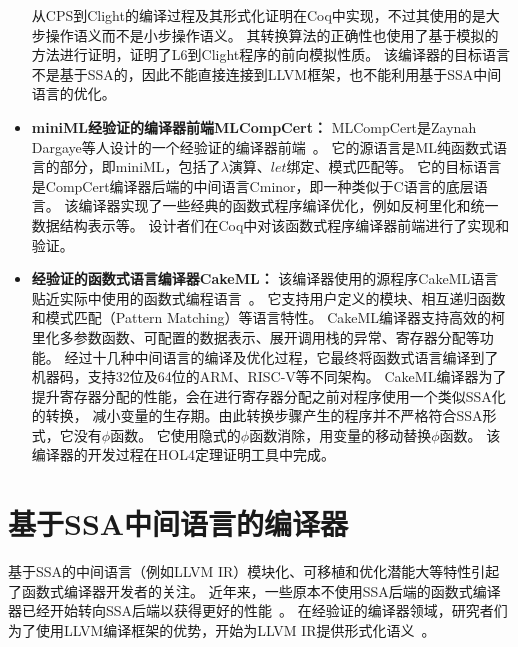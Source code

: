 \begin{itemize}
    从CPS到Clight的编译过程及其形式化证明在Coq中实现，不过其使用的是大步操作语义而不是小步操作语义。
    其转换算法的正确性也使用了基于模拟的方法进行证明，证明了L6到Clight程序的前向模拟性质。
    该编译器的目标语言不是基于SSA的，因此不能直接连接到LLVM框架，也不能利用基于SSA中间语言的优化。
    \item \textbf{miniML经验证的编译器前端MLCompCert：} 
    MLCompCert是Zaynah Dargaye等人设计的一个经验证的编译器前端~\cite{dargaye2009verification}。
    它的源语言是ML纯函数式语言的部分，即miniML，包括了$\lambda$演算、$let$绑定、模式匹配等。
    它的目标语言是CompCert编译器后端的中间语言Cminor，即一种类似于C语言的底层语言。
    该编译器实现了一些经典的函数式程序编译优化，例如反柯里化和统一数据结构表示等。
    设计者们在Coq中对该函数式程序编译器前端进行了实现和验证。
    \item \textbf{经验证的函数式语言编译器CakeML：} 
    该编译器使用的源程序CakeML语言贴近实际中使用的函数式编程语言~\cite{cakeml2016}。
    它支持用户定义的模块、相互递归函数和模式匹配（Pattern Matching）等语言特性。
    CakeML编译器支持高效的柯里化多参数函数、可配置的数据表示、展开调用栈的异常、寄存器分配等功能。
    经过十几种中间语言的编译及优化过程，它最终将函数式语言编译到了机器码，支持32位及64位的ARM、RISC-V等不同架构。
    CakeML编译器为了提升寄存器分配的性能，会在进行寄存器分配之前对程序使用一个类似SSA化的转换，
    减小变量的生存期。由此转换步骤产生的程序并不严格符合SSA形式，它没有$\phi$函数。
    它使用隐式的$\phi$函数消除，用变量的移动替换$\phi$函数。
    该编译器的开发过程在HOL4定理证明工具中完成。
\end{itemize}


\section{基于SSA中间语言的编译器} \label{sec:relatedssa}

基于SSA的中间语言（例如LLVM IR）模块化、可移植和优化潜能大等特性引起了函数式编译器开发者的关注。
近年来，一些原本不使用SSA后端的函数式编译器已经开始转向SSA后端以获得更好的性能~\cite{farvardin2020new}。
在经验证的编译器领域，研究者们为了使用LLVM编译框架的优势，开始为LLVM IR提供形式化语义~\cite{zhao2012formalizing}。

